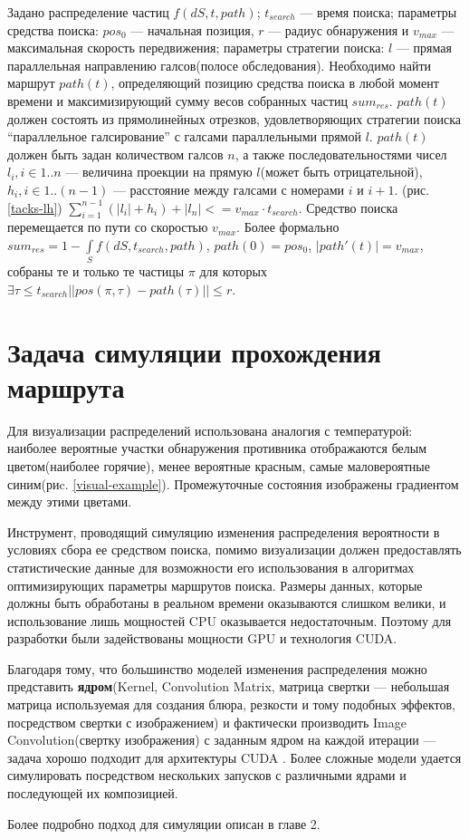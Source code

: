 Задано распределение частиц $f(dS, t, path)$; $t_{search}$ --- время поиска;
параметры средства поиска: $pos_0$ --- начальная позиция, $r$ --- радиус обнаружения и 
$v_{max}$ --- максимальная скорость передвижения; параметры стратегии поиска: $l$ --- прямая
параллельная направлению галсов(полосе обследования).
 Необходимо найти маршрут $path(t)$, определяющий
позицию средства поиска в любой момент времени и максимизирующий сумму весов собранных
частиц $sum_{res}$. $path(t)$ должен состоять из прямолинейных отрезков, удовлетворяющих
стратегии поиска ``параллельное галсирование'' с галсами параллельными прямой $l$.
$path(t)$ должен быть задан количеством галсов $n$, а также последовательностями чисел
$l_i, i \in 1..n$ --- величина проекции на прямую $l$(может быть отрицательной),
$h_i, i \in 1..(n-1)$ --- расстояние между галсами с номерами $i$ и $i+1$. (рис. \ref{tacks-lh})
$\sum\limits_{i=1}^{n-1} (|l_i|+h_i) + |l_n| <= v_{max} \cdot t_{search}$. Средство поиска 
перемещается по пути со скоростью $v_{max}$.
Более формально $sum_{res}=1-\int\limits_Sf(dS, t_{search}, path)$, $path(0)=pos_0$,
$|path'(t)| = v_{max}$, собраны те и только те частицы
$\pi$ для которых $\exists \tau\le t_{search} ||pos(\pi, \tau)-path(\tau)|| \le r$. 

\FloatBarrier
\section{Задача симуляции прохождения маршрута}
Для визуализации распределений использована аналогия с температурой: наиболее вероятные
участки обнаружения противника отображаются белым цветом(наиболее горячие), менее вероятные красным,
самые маловероятные синим(риc. \ref{visual-example}).
Промежуточные состояния изображены градиентом между этими цветами.


Инструмент, проводящий симуляцию изменения распределения вероятности в условиях сбора ее средством
поиска, помимо визуализации должен предоставлять статистические данные для возможности его
использования в алгоритмах оптимизирующих параметры маршрутов поиска. Размеры данных, которые 
должны быть обработаны в реальном времени оказываются слишком велики, и использование лишь мощностей
CPU оказывается недостаточным. Поэтому для разработки были задействованы мощности GPU и технология
CUDA. 

Благодаря тому, что большинство моделей изменения распределения можно представить
\textbf{ядром}(Kernel, Convolution Matrix, матрица свертки --- небольшая матрица используемая для 
создания блюра, резкости и тому подобных эффектов, посредством свертки с изображением)
 и фактически производить Image Convolution(свертку изображения) \cite{nov12, gon02} с заданным ядром
 на каждой итерации --- задача хорошо подходит для архитектуры CUDA \cite{ryo08}.
 Более сложные модели удается симулировать посредством нескольких запусков с различными ядрами и
последующей их композицией.

 Более подробно подход для симуляции описан в главе 2.

\FloatBarrier
